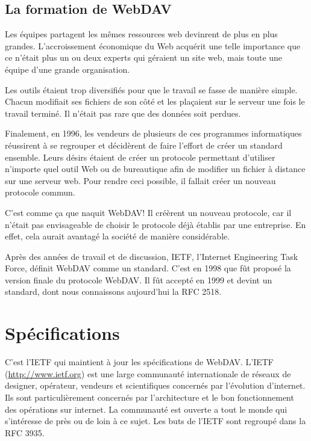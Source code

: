 \documentclass[a4paper, 11pt]{article}
\begin{document}
{	%
	\subsection{La formation de WebDAV}
	
		Les équipes partagent les mêmes ressources web devinrent de plus en plus grandes. L'accroissement économique du Web acquérit une telle importance que ce n'était plus un ou deux experts qui géraient un site web, mais toute une équipe d'une grande organisation.
		
		Les outils étaient trop diversifiés pour que le travail se fasse de manière simple. Chacun modifiait ses fichiers de son côté et les plaçaient sur le serveur une fois le travail terminé. Il n'était pas rare que des données soit perdues.
		
		Finalement, en 1996, les vendeurs de plusieurs de ces programmes informatiques réussirent à se regrouper et décidèrent de faire l'effort de créer un standard ensemble. Leurs désirs étaient de créer un protocole permettant d'utiliser n'importe quel outil Web ou de bureautique afin de modifier un fichier à distance sur une serveur web. Pour rendre ceci possible, il fallait créer un nouveau protocole commun.
		
		C'est comme ça que naquit WebDAV! Il créèrent un nouveau protocole, car il n'était pas envisageable de choisir le protocole déjà établis par une entreprise. En effet, cela aurait avantagé la société de manière considérable.

		Après des années de travail et de discussion, IETF, l'Internet Engineering Task Force, définit WebDAV comme un standard. C'est en 1998 que fût proposé la version finale du protocole WebDAV. Il fût accepté en 1999 et devint un standard, dont nous connaissons aujourd'hui la RFC 2518.
		
\section{Spécifications}

	C'est l'IETF qui maintient à jour les spécifications de WebDAV. L'IETF (\url{http://www.ietf.org}) est une large communauté internationale de réseaux de designer, opérateur, vendeurs et scientifiques concernés par l'évolution d'internet. Ils sont particulièrement concernés par l'architecture et le bon fonctionnement des opérations sur internet. La communauté est ouverte a tout le monde qui s'intéresse de près ou de loin à ce sujet. Les buts de l'IETF sont regroupé dans la RFC 3935.	
	
}
\end{document}
